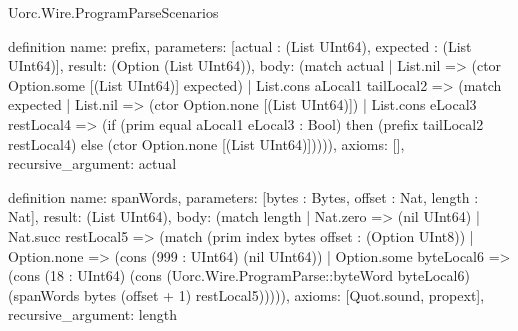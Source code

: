 \begin{lexlean}{Uorc.Wire.ProgramParseScenarios}
\begin{semanticmodule}
definition{
  name: prefix,
  parameters: [actual : (List UInt64), expected : (List UInt64)],
  result: (Option (List UInt64)),
  body: (match actual
    | List.nil => (ctor Option.some [(List UInt64)] expected)
    | List.cons aLocal1 tailLocal2 => (match expected
      | List.nil => (ctor Option.none [(List UInt64)])
      | List.cons eLocal3 restLocal4 => (if (prim equal aLocal1 eLocal3 : Bool) then (prefix tailLocal2 restLocal4) else (ctor Option.none [(List UInt64)])))),
  axioms: [],
  recursive_argument: actual
}

definition{
  name: spanWords,
  parameters: [bytes : Bytes, offset : Nat, length : Nat],
  result: (List UInt64),
  body: (match length
    | Nat.zero => (nil UInt64)
    | Nat.succ restLocal5 => (match (prim index bytes offset : (Option UInt8))
      | Option.none => (cons (999 : UInt64) (nil UInt64))
      | Option.some byteLocal6 => (cons (18 : UInt64) (cons (Uorc.Wire.ProgramParse::byteWord byteLocal6) (spanWords bytes (offset + 1) restLocal5))))),
  axioms: [Quot.sound, propext],
  recursive_argument: length
}


\end{semanticmodule}
\end{lexlean}
